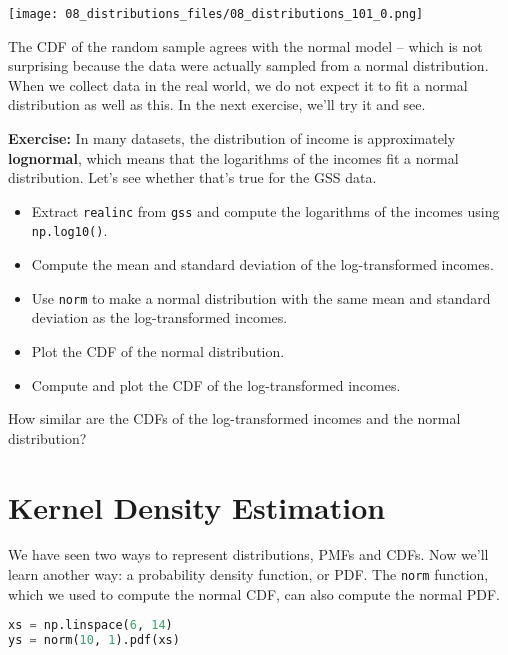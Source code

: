 \begin{center}
\texttt{[image: 08\_distributions\_files/08\_distributions\_101\_0.png]}
\end{center}

The CDF of the random sample agrees with the normal model -- which is
not surprising because the data were actually sampled from a normal
distribution. When we collect data in the real world, we do not expect
it to fit a normal distribution as well as this. In the next exercise,
we'll try it and see.

\textbf{Exercise:} In many datasets, the distribution of income is
approximately \textbf{lognormal}, which means that the logarithms of the
incomes fit a normal distribution. Let's see whether that's true for the
GSS data.

\begin{itemize}
\item
  Extract \passthrough{\lstinline!realinc!} from
  \passthrough{\lstinline!gss!} and compute the logarithms of the
  incomes using \passthrough{\lstinline!np.log10()!}.
\item
  Compute the mean and standard deviation of the log-transformed
  incomes.
\item
  Use \passthrough{\lstinline!norm!} to make a normal distribution with
  the same mean and standard deviation as the log-transformed incomes.
\item
  Plot the CDF of the normal distribution.
\item
  Compute and plot the CDF of the log-transformed incomes.
\end{itemize}

How similar are the CDFs of the log-transformed incomes and the normal
distribution?

\section{Kernel Density Estimation}\label{kernel-density-estimation}

We have seen two ways to represent distributions, PMFs and CDFs. Now
we'll learn another way: a probability density function, or PDF. The
\passthrough{\lstinline!norm!} function, which we used to compute the
normal CDF, can also compute the normal PDF.

\begin{lstlisting}[language=Python,style=source]
xs = np.linspace(6, 14)
ys = norm(10, 1).pdf(xs)
\end{lstlisting}

